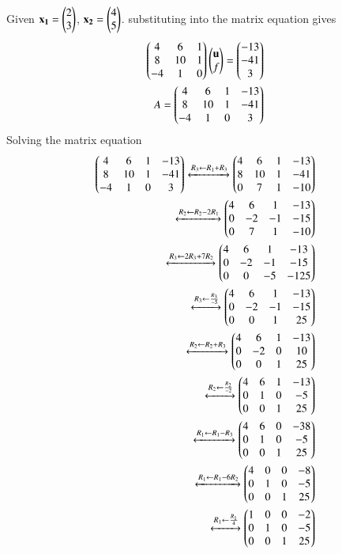 \documentclass[journal]{IEEEtran}
\begin{document}
Given $\mathbf{x_1}=\begin{pmatrix}2\\3\end{pmatrix}$, $\mathbf{x_2}=\begin{pmatrix}4\\5\end{pmatrix}$. substituting into the matrix equation gives
\begin{align}
\begin{pmatrix}4 & 6 & 1\\8 & 10 & 1\\-4 & 1 & 0\end{pmatrix}\begin{pmatrix}\mathbf{u}\\f\end{pmatrix}=\begin{pmatrix}-13\\-41\\3\end{pmatrix}\\
A=\begin{pmatrix}4 & 6 & 1 & -13\\8 & 10 & 1 & -41\\-4 & 1 & 0 & 3\end{pmatrix}
\end{align}
Solving the matrix equation
\begin{align}
\begin{pmatrix}4 & 6 & 1 & -13\\8 & 10 & 1 & -41\\-4 & 1 & 0 & 3\end{pmatrix}\xleftrightarrow[]{R_3 \leftarrow R_1+R_3}\begin{pmatrix}4 & 6 & 1 & -13\\8 & 10 & 1 & -41\\0 & 7 & 1 & -10\end{pmatrix}\\
\xleftrightarrow[]{R_2 \leftarrow R_2-2R_1}\begin{pmatrix}4 & 6 & 1 & -13\\0 & -2 & -1 & -15\\0 & 7 & 1 & -10\end{pmatrix}\\
\xleftrightarrow[]{R_3 \leftarrow 2R_3+7R_2}\begin{pmatrix}4 & 6 & 1 & -13\\0 & -2 & -1 & -15\\0 & 0 & -5 & -125\end{pmatrix}\\
\xleftrightarrow[]{R_3 \leftarrow \frac{R_3}{-5}}\begin{pmatrix}4 & 6 & 1 & -13\\0 & -2 & -1 & -15\\0 & 0 & 1 & 25\end{pmatrix}\\
\xleftrightarrow[]{R_2 \leftarrow R_2+R_3}\begin{pmatrix}4 & 6 & 1 & -13\\0 & -2 & 0 & 10\\0 & 0 & 1 & 25\end{pmatrix}\\
\xleftrightarrow[]{R_2 \leftarrow \frac{R_2}{-2}}\begin{pmatrix}4 & 6 & 1 & -13\\0 & 1 & 0 & -5	\\0 & 0 & 1 & 25\end{pmatrix}\\
\xleftrightarrow[]{R_1 \leftarrow R_1-R_3}\begin{pmatrix}4 & 6 & 0 & -38\\0 & 1 & 0 & -5\\0 & 0 & 1 & 25\end{pmatrix}\\
\xleftrightarrow[]{R_1 \leftarrow R_1-6R_2}\begin{pmatrix}4 & 0 & 0 & -8\\0 & 1 & 0 & -5\\0 & 0 & 1 & 25\end{pmatrix}\\
\xleftrightarrow[]{R_1 \leftarrow \frac{R_1}{4}}\begin{pmatrix}1 & 0 & 0 & -2\\0 & 1 & 0 & -5\\0 & 0 & 1 & 25\end{pmatrix}
\end{align}
\end{document}
